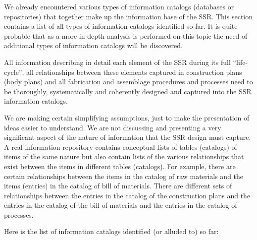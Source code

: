 We already encountered various types of information catalogs (databases
or repositories) that together make up the information base of the SSR.
This section contains a list of all types of information catalogs
identified so far. It is quite probable that as a more in depth
analysis is performed on this topic the need of additional types of
information catalogs will be discovered.


\bigskip

All information describing in detail each element of the SSR during its
full “life-cycle”, all relationships between these elements captured in
construction plans (body plans) and all fabrication and assemblage
procedures and processes need to be thoroughly, systematically and
coherently designed and captured into the SSR information catalogs.


\bigskip

We are making certain simplifying assumptions, just to make the
presentation of ideas easier to understand. We are not discussing and
presenting a very significant aspect of the nature of information that
the SSR design must capture. A real information repository contains
conceptual lists of tables (catalogs) of items of the same nature but
also contain lists of the various relationships that exist between the
items in different tables (catalogs).  For example, there are certain
relationships between the items in the catalog of raw materials and the
items (entries) in the catalog of bill of materials. There are
different sets of relationships between the entries in the catalog of
the construction plans and the entries in the catalog of the bill of
materials and the entries in the catalog of processes.


\bigskip

Here is the list of information catalogs identified (or alluded to) so
far:


\bigskip

